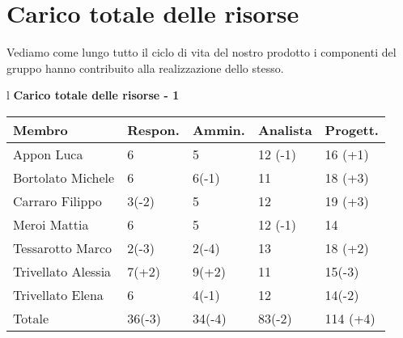 \newpage
\section{Carico totale delle risorse}
Vediamo come lungo tutto il ciclo di vita del nostro prodotto i componenti del gruppo hanno contribuito alla realizzazione dello stesso.
\begin{table}[hbtp]
\large{
\begin{tabular}{l}
\Large{\textbf{\textsf{Carico totale delle risorse - 1}}} \\

\begin{tabular}{||p{3.5cm}||p{2cm}||p{2cm}||p{2cm}||p{2cm}||}
\hline
\textbf{Membro} & \textbf{Respon.} & \textbf{Ammin.} & \textbf{Analista}
& \textbf{Progett.}\\
\hline
{Appon Luca}&6&5&12 \footnotesize{(-1)}&16 \footnotesize{(+1)} \\ 
\hline 
{Bortolato Michele} &6&6\footnotesize{(-1)}&11&18 \footnotesize{(+3)}\\ 
\hline
{Carraro Filippo}&3\footnotesize{(-2)}&5&12&19 \footnotesize{(+3)} \\
\hline
{Meroi Mattia}&6&5&12 \footnotesize{(-1)}&14\\
\hline
{Tessarotto Marco} &2\footnotesize{(-3)}&2\footnotesize{(-4)}&13&18 \footnotesize{(+2)}\\
\hline
{Trivellato Alessia} &7\footnotesize{(+2)}&9\footnotesize{(+2)}&11&15\footnotesize{(-3)} \\
\hline
{Trivellato Elena} &6&4\footnotesize{(-1)}&12&14\footnotesize{(-2)} \\
\hline
{Totale}& 36\footnotesize{(-3)}&34\footnotesize{(-4)}&83\footnotesize{(-2)}&114 \footnotesize{(+4)} \\
\hline



\end{tabular} \\
\end{tabular}
}
\end{table}

